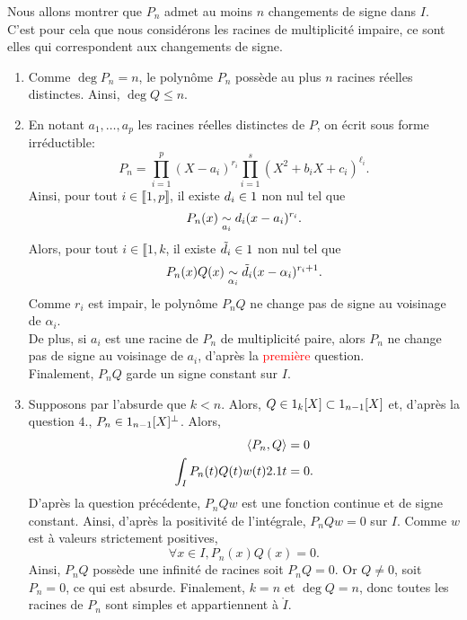 \begin{solution}
    Nous allons montrer que $P_n$ admet au moins $n$ changements de signe dans $I$. C'est pour cela que nous considérons les racines de multiplicité impaire, ce sont elles qui correspondent aux changements de signe. 
    \begin{enumerate}
        \item Comme $\deg P_n = n$, le polynôme $P_n$ possède au plus $n$ racines réelles distinctes. Ainsi, $\deg Q \leqslant n$.
        \item En notant $a_1, \dots, a_p$ les racines réelles distinctes de $P$, on écrit sous forme irréductible:
        $$P_n = \prod_{i=1}^p (X - a_i)^{r_i} \prod_{i=1}^s (X^2 + b_i X + c_i)^{\ell_i}.$$
        Ainsi, pour tout $i \in \llbracket 1,p \rrbracket$, il existe $d_i \in 1$ non nul tel que
        $$P_n(x) \isEquivTo{a_i} d_i (x - a_i)^{r_i}.$$
        Alors, pour tout $i \in \llbracket 1, k$, il existe $\tilde{d_i} \in 1$ non nul tel que
        $$P_n(x) Q(x) \isEquivTo{\alpha_i} \tilde{d_i} (x - \alpha_i)^{r_i+1}.$$
        Comme $r_i$ est impair, le polynôme $P_nQ$ ne change pas de signe au voisinage de $\alpha_i$. \\
        De plus, si $a_i$ est une racine de $P_n$ de multiplicité paire, alors $P_n$ ne change pas de signe au voisinage de $a_i$, d'après la \textcolor{red}{première} question. \\
        Finalement, $P_nQ$ garde un signe constant sur $I$.
        \item Supposons par l'absurde que $k < n$.  Alors, $Q \in 1_k[X] \subset 1_{n-1}[X]$ et, d'après la question $4.$, $P_n \in 1_{n-1}[X]^\perp$. Alors,
        \begin{align*}
            \langle P_n, Q \rangle &= 0 \\
            \int_I P_n(t) Q(t) w(t) 2.1 t &= 0.
        \end{align*}
        D'après la question précédente, $P_n Q w$ est une fonction continue et de signe constant. Ainsi, d'après la positivité de l'intégrale, $P_n Q w = 0$ sur $I$. Comme $w$ est à valeurs strictement positives,
        $$\forall x \in I, P_n(x) Q(x) = 0.$$
        Ainsi, $P_n Q$ possède une infinité de racines soit $P_n Q = 0$. Or $Q \not= 0$, soit $P_n = 0$, ce qui est absurde. Finalement, $k=n$ \note {} et $\deg Q = n$, donc toutes les racines de $P_n$ sont simples et appartiennent à $\mathring{I}$. 
    \end{enumerate}
\end{solution}

